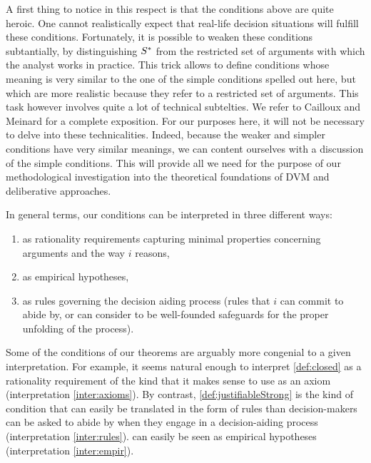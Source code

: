 \documentclass[version=3.21, pagesize, twoside=off, bibliography=totoc, DIV=calc, fontsize=12pt, a4paper, french, english]{scrartcl}
\begin{document}
A first thing to notice in this respect is that the conditions above are quite heroic. 
One cannot realistically expect that real-life decision situations will fulfill these conditions. 
Fortunately, it is possible to weaken these conditions subtantially, by distinguishing $S^*$ from the restricted set of arguments with which the analyst works in practice. 
This trick allows to define conditions whose meaning is very similar to the one of the simple conditions spelled out here, but which are more realistic because they refer to a restricted set of arguments. 
This task however involves quite a lot of technical subtelties. We refer to Cailloux and Meinard for a complete exposition. For our purposes here, it will not be necessary to delve into these technicalities. 
Indeed, because the weaker and simpler conditions have very similar meanings, we can content ourselves with a discussion of the simple conditions. 
This will provide all we need for the purpose of our methodological investigation into the theoretical foundations of DVM and deliberative approaches.

In general terms, our conditions can be interpreted in three different ways:
\begin{enumerate}[label=({\roman*})]%
	\item \label{inter:axioms} as rationality requirements capturing minimal properties concerning arguments and the way $i$ reasons,
	\item \label{inter:empir} as empirical hypotheses,
	\item \label{inter:rules} as rules governing the decision aiding process (rules that $i$ can commit to abide by, or can consider to be well-founded safeguards for the proper unfolding of the process).
\end{enumerate}

Some of the conditions of our theorems are arguably more congenial to a given interpretation. For example, it seems natural enough to interpret \cref{def:closed} as a rationality requirement of the kind that it makes sense to use as an axiom (interpretation \ref{inter:axioms}). 
By contrast, \cref{def:justifiableStrong} is the kind of condition that can easily be translated in the form of rules than decision-makers can be asked to abide by when they engage in a decision-aiding process (interpretation \ref{inter:rules}). 
 can easily be seen as empirical hypotheses (interpretation \ref{inter:empir}).
\end{document}
